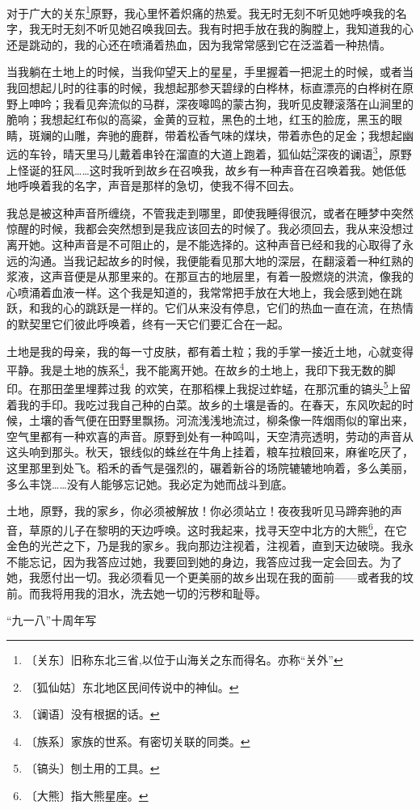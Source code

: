 \documentclass[12pt,UTF-8,openany]{ctexbook}
\begin{document}
\begin{normalsize}
    
    对于广大的关东\footnote{〔关东〕旧称东北三省,以位于山海关之东而得名。亦称“关外”}原野，我心里怀着炽痛的热爱。我无时无刻不听见她呼唤我的名字，我无时无刻不听见她召唤我回去。我有时把手放在我的胸膛上，我知道我的心还是跳动的，我的心还在喷涌着热血，因为我常常感到它在泛滥着一种热情。
    
    当我躺在土地上的时候，当我仰望天上的星星，手里握着一把泥土的时候，或者当我回想起儿时的往事的时候，我想起那参天碧绿的白桦林，标直漂亮的白桦树在原野上呻吟；我看见奔流似的马群，深夜嗥鸣的蒙古狗，我听见皮鞭滚落在山涧里的脆响；我想起红布似的高粱，金黄的豆粒，黑色的土地，红玉的脸庞，黑玉的眼睛，斑斓的山雕，奔驰的鹿群，带着松香气味的煤块，带着赤色的足金；我想起幽远的车铃，晴天里马儿戴着串铃在溜直的大道上跑着，狐仙姑\footnote{〔狐仙姑〕东北地区民间传说中的神仙。}深夜的谰语\footnote{〔谰语〕没有根据的话。}，原野上怪诞的狂风……这时我听到故乡在召唤我，故乡有一种声音在召唤着我。她低低地呼唤着我的名字，声音是那样的急切，使我不得不回去。
    
    我总是被这种声音所缠绕，不管我走到哪里，即使我睡得很沉，或者在睡梦中突然惊醒的时候，我都会突然想到是我应该回去的时候了。我必须回去，我从来没想过离开她。这种声音是不可阻止的，是不能选择的。这种声音已经和我的心取得了永远的沟通。当我记起故乡的时候，我便能看见那大地的深层，在翻滚着一种红熟的浆液，这声音便是从那里来的。在那亘古的地层里，有着一股燃烧的洪流，像我的心喷涌着血液一样。这个我是知道的，我常常把手放在大地上，我会感到她在跳跃，和我的心的跳跃是一样的。它们从来没有停息，它们的热血一直在流，在热情的默契里它们彼此呼唤着，终有一天它们要汇合在一起。
    
    土地是我的母亲，我的每一寸皮肤，都有着土粒；我的手掌一接近土地，心就变得平静。我是土地的族系\footnote{〔族系〕家族的世系。有密切关联的同类。}，我不能离开她。在故乡的土地上，我印下我无数的脚印。在那田垄里埋葬过我 的欢笑，在那稻棵上我捉过蚱蜢，在那沉重的镐头\footnote{〔镐头〕刨土用的工具。}上留着我的手印。我吃过我自己种的白菜。故乡的土壤是香的。在春天，东风吹起的时候，土壤的香气便在田野里飘扬。河流浅浅地流过，柳条像一阵烟雨似的窜出来，空气里都有一种欢喜的声音。原野到处有一种鸣叫，天空清亮透明，劳动的声音从这头响到那头。秋天，银线似的蛛丝在牛角上挂着，粮车拉粮回来，麻雀吃厌了，这里那里到处飞。稻禾的香气是强烈的，碾着新谷的场院辘辘地响着，多么美丽，多么丰饶……没有人能够忘记她。我必定为她而战斗到底。
    
    土地，原野，我的家乡，你必须被解放！你必须站立！夜夜我听见马蹄奔驰的声音，草原的儿子在黎明的天边呼唤。这时我起来，找寻天空中北方的大熊\footnote{〔大熊〕指大熊星座。}，在它金色的光芒之下，乃是我的家乡。我向那边注视着，注视着，直到天边破晓。我永不能忘记，因为我答应过她，我要回到她的身边，我答应过我一定会回去。为了她，我愿付出一切。我必须看见一个更美丽的故乡出现在我的面前——或者我的坟前。而我将用我的泪水，洗去她一切的污秽和耻辱。
    
    \hfill “九一八”十周年写
    
\end{normalsize}
\end{document}
